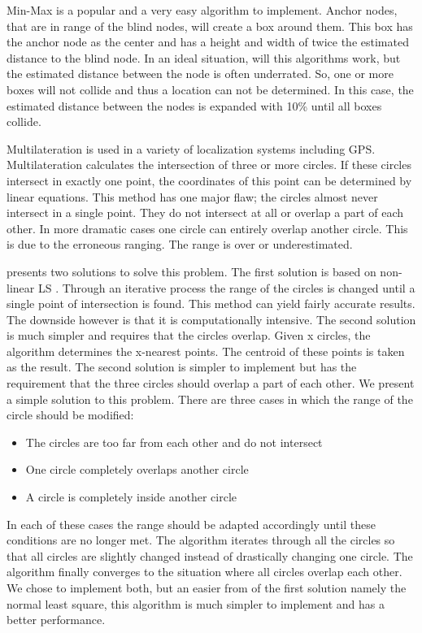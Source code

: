 Min-Max is a popular and a very easy algorithm to implement. Anchor nodes, that are in range of the blind nodes, will create a box around them. This box has the anchor node as the center and has a height and width of twice the estimated distance to the blind node. In an ideal situation, will this algorithms work, but the estimated distance between the node is often underrated. So, one or more boxes will not collide and thus a location can not be determined. In this case, the estimated distance between the nodes is expanded with 10\% until all boxes collide.

Multilateration is used in a variety of localization systems including GPS. Multilateration calculates the intersection of three or more circles. If these circles intersect in exactly one point, the coordinates of this point can be determined by linear equations.  This method has one major flaw; the circles almost never intersect in a single point. They do not intersect at all or overlap a part of each other. In more dramatic cases one circle can entirely overlap another circle.  This is due to the erroneous ranging. The range is over or underestimated. 

\cite{trilat} presents two solutions to solve this problem. The first solution is based on non-linear LS . Through an iterative process the range of the circles is changed until a single point of intersection is found. This method can yield fairly accurate results. The downside however is that it is computationally intensive. The second solution is much simpler and requires that the circles overlap. Given x circles, the algorithm determines the x-nearest points. The centroid of these points is taken as the result. 
The second solution is simpler to implement but has the requirement that the three circles should overlap a part of each other. We present a simple solution to this problem. There are three cases in which the range of the circle should be modified:
\begin{itemize}
	\item The circles are too far from each other and do not intersect 
	\item One circle completely overlaps another circle
	\item A circle is completely inside another circle
\end{itemize}
In each of these cases the range should be adapted accordingly until these conditions are no longer met. The algorithm iterates through all the circles so that all circles are slightly changed instead of drastically changing one circle. The algorithm finally converges to the situation where all circles overlap each other.
We chose to implement both, but an easier from of the first solution namely the normal least square\cite{sayed2005nbw}, this algorithm is much simpler to implement and has a better performance.
